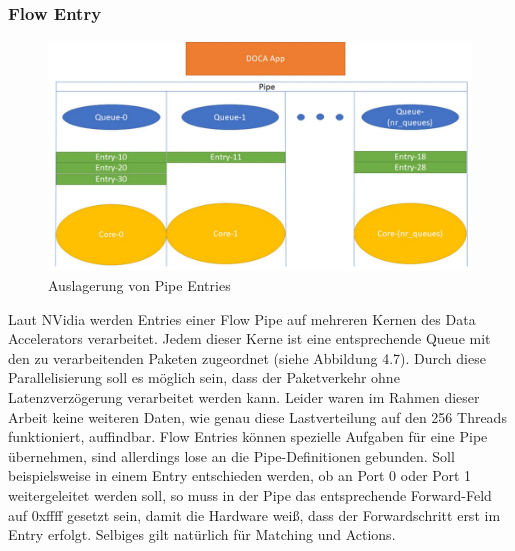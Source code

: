 \subsubsection{Flow Entry}
\begin{figure}
    \centering
    \includegraphics[width=1\linewidth]{images/entries.png}
    \caption{Auslagerung von Pipe Entries \cite{nvidia_doca_flow_v1_2}}
    \label{fig:enter-label}
\end{figure}
Laut NVidia werden Entries einer Flow Pipe auf mehreren Kernen des Data Accelerators verarbeitet. Jedem dieser Kerne ist eine entsprechende Queue mit den zu verarbeitenden Paketen zugeordnet  (siehe Abbildung 4.7). Durch diese Parallelisierung soll es möglich sein, dass der Paketverkehr ohne Latenzverzögerung verarbeitet werden kann. Leider waren im Rahmen dieser Arbeit keine weiteren Daten, wie genau diese Lastverteilung auf den 256 Threads funktioniert, auffindbar. Flow Entries können spezielle Aufgaben für eine Pipe übernehmen, sind allerdings lose an die Pipe-Definitionen gebunden. Soll beispielsweise in einem Entry entschieden werden, ob an Port 0 oder Port 1 weitergeleitet werden soll, so muss in der Pipe das entsprechende Forward-Feld auf 0xffff gesetzt sein, damit die Hardware weiß, dass der Forwardschritt erst im Entry erfolgt. Selbiges gilt natürlich für Matching und Actions.
